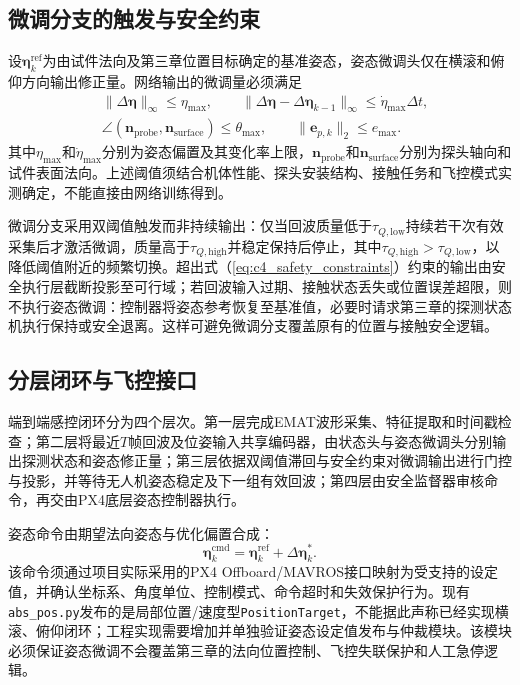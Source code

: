 \subsection{微调分支的触发与安全约束}

设$\boldsymbol{\eta}_{k}^{\mathrm{ref}}$为由试件法向及第三章位置目标确定的基准姿态，姿态微调头仅在横滚和俯仰方向输出修正量。网络输出的微调量必须满足
\begin{equation}
\begin{aligned}
&\|\Delta\boldsymbol{\eta}\|_{\infty}\leq\eta_{\max}, \qquad
\|\Delta\boldsymbol{\eta}-\Delta\boldsymbol{\eta}_{k-1}\|_{\infty}
\leq \dot{\eta}_{\max}\Delta t,\\
&\angle(\mathbf{n}_{\mathrm{probe}},\mathbf{n}_{\mathrm{surface}})
\leq\theta_{\max},\qquad
\|\mathbf{e}_{p,k}\|_2\leq e_{\max}.
\end{aligned}
\label{eq:c4_safety_constraints}
\end{equation}
其中$\eta_{\max}$和$\dot{\eta}_{\max}$分别为姿态偏置及其变化率上限，$\mathbf{n}_{\mathrm{probe}}$和$\mathbf{n}_{\mathrm{surface}}$分别为探头轴向和试件表面法向。上述阈值须结合机体性能、探头安装结构、接触任务和飞控模式实测确定，不能直接由网络训练得到。

微调分支采用双阈值触发而非持续输出：仅当回波质量低于$\tau_{Q,\mathrm{low}}$持续若干次有效采集后才激活微调，质量高于$\tau_{Q,\mathrm{high}}$并稳定保持后停止，其中$\tau_{Q,\mathrm{high}}>\tau_{Q,\mathrm{low}}$，以降低阈值附近的频繁切换。超出式（\ref{eq:c4_safety_constraints}）约束的输出由安全执行层截断投影至可行域；若回波输入过期、接触状态丢失或位置误差超限，则不执行姿态微调：控制器将姿态参考恢复至基准值，必要时请求第三章的探测状态机执行保持或安全退离。这样可避免微调分支覆盖原有的位置与接触安全逻辑。

\subsection{分层闭环与飞控接口}

端到端感控闭环分为四个层次。第一层完成EMAT波形采集、特征提取和时间戳检查；第二层将最近$T$帧回波及位姿输入共享编码器，由状态头与姿态微调头分别输出探测状态和姿态修正量；第三层依据双阈值滞回与安全约束对微调输出进行门控与投影，并等待无人机姿态稳定及下一组有效回波；第四层由安全监督器审核命令，再交由PX4底层姿态控制器执行。

姿态命令由期望法向姿态与优化偏置合成：
\begin{equation}
\boldsymbol{\eta}_{k}^{\mathrm{cmd}}
=\boldsymbol{\eta}_{k}^{\mathrm{ref}}
+\Delta\boldsymbol{\eta}_{k}^{*}.
\label{eq:c4_attitude_cmd}
\end{equation}
该命令须通过项目实际采用的PX4 Offboard/MAVROS接口映射为受支持的设定值，并确认坐标系、角度单位、控制模式、命令超时和失效保护行为。现有\texttt{abs\_pos.py}发布的是局部位置/速度型\texttt{PositionTarget}，不能据此声称已经实现横滚、俯仰闭环；工程实现需要增加并单独验证姿态设定值发布与仲裁模块。该模块必须保证姿态微调不会覆盖第三章的法向位置控制、飞控失联保护和人工急停逻辑。

